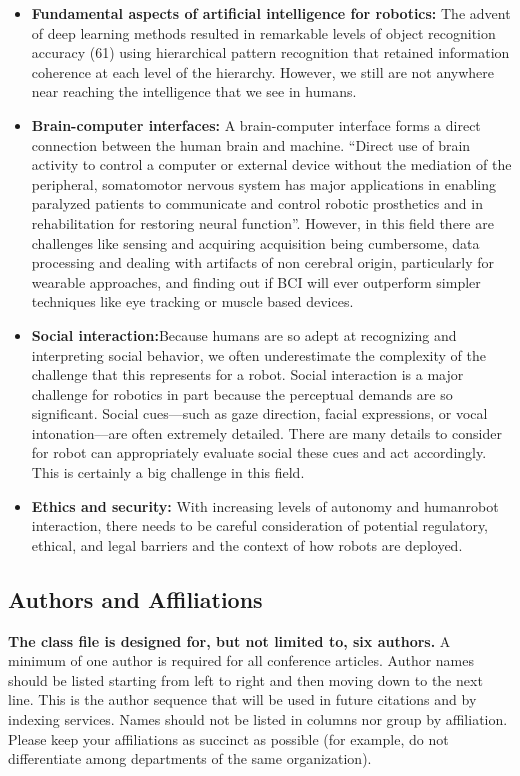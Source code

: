 \documentclass[conference]{IEEEtran}
\begin{document}
\begin{itemize}
\item \textbf{Fundamental aspects of artificial intelligence for robotics:} The advent of deep learning methods resulted in remarkable levels of object recognition accuracy (61) using hierarchical pattern recognition that retained information coherence at each level of the hierarchy. However, we still are not anywhere near reaching the intelligence that we see in humans.
\item \textbf{Brain-computer interfaces:} A brain-computer interface forms a direct connection between the human brain and machine. ``Direct use of brain activity to control a computer or external device without the mediation of the peripheral, somatomotor nervous system has major applications in enabling paralyzed patients to communicate and control robotic prosthetics and in rehabilitation for restoring neural function''\autocite{yang2018grand}. However, in this field there are challenges like sensing and acquiring acquisition being cumbersome, data processing and dealing with artifacts of non cerebral origin, particularly for wearable approaches, and finding out if BCI will ever outperform simpler techniques like eye tracking or muscle based devices.
\item \textbf{Social interaction:}Because humans are so adept at recognizing and interpreting social behavior, we often underestimate the complexity of the challenge that this represents for a robot. Social interaction is a major challenge for robotics in part because the perceptual demands are so significant. Social cues—such as gaze direction, facial expressions, or vocal intonation—are often extremely detailed. There are many details to consider for robot can appropriately evaluate social these cues and act accordingly. This is certainly a big challenge in this field.
\item \textbf{Ethics and security:} With increasing levels of autonomy and humanrobot interaction, there needs to be careful consideration of potential regulatory, ethical, and legal barriers and the context of how robots are deployed.
\end{itemize}

\subsection{Authors and Affiliations}
\textbf{The class file is designed for, but not limited to, six authors.} A 
minimum of one author is required for all conference articles. Author names 
should be listed starting from left to right and then moving down to the 
next line. This is the author sequence that will be used in future citations 
and by indexing services. Names should not be listed in columns nor group by 
affiliation. Please keep your affiliations as succinct as possible (for 
example, do not differentiate among departments of the same organization).
\end{document}
